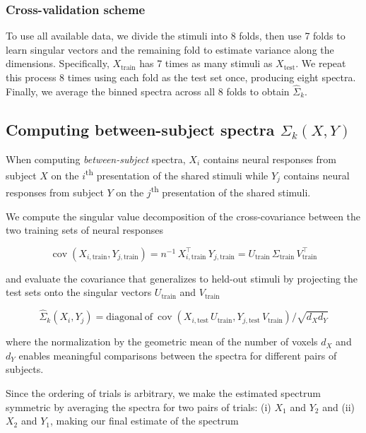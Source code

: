 \documentclass[10pt]{article}
\begin{document}
\subsubsection{Cross-validation scheme}\label{cross-validation-scheme}

To use all available data, we divide the stimuli into 8 folds, then use
7 folds to learn singular vectors and the remaining fold to estimate
variance along the dimensions. Specifically, \(X_\text{train}\) has 7
times as many stimuli as \(X_\text{test}\). We repeat this process 8
times using each fold as the test set once, producing eight spectra.
Finally, we average the binned spectra across all 8 folds to obtain
\(\hat{\Sigma}_k\).

\subsection{\texorpdfstring{Computing between-subject spectra
\(\Sigma_k(X,Y)\)}{Computing between-subject spectra \textbackslash Sigma\_k(X,Y)}}\label{computing-between-subject-spectra-sigma_kxy}

When computing \emph{between-subject} spectra, \(X_i\) contains neural
responses from subject \(X\) on the \(i\)\textsuperscript{th}
presentation of the shared stimuli while \(Y_j\) contains neural
responses from subject \(Y\) on the \(j\)\textsuperscript{th}
presentation of the shared stimuli.

We compute the singular value decomposition of the cross-covariance
between the two training sets of neural responses

\[
\operatorname{cov}
\left(X_{i,\text{train}} , Y_{j,\text{train}}\right)
= n^{-1}\,X_{i,\text{train}}^\top\,Y_{j,\text{train}}
= U_\text{train}\, \Sigma_\text{train}\, V_\text{train}^\top
\]

and evaluate the covariance that generalizes to held-out stimuli by
projecting the test sets onto the singular vectors \(U_\text{train}\)
and \(V_\text{train}\)

\[
\hat{\Sigma}_k(X_i,Y_j) = \mathrm{diagonal~of~} \operatorname{cov}
\left(X_{i, \text{test}}\, U_\text{train} , Y_{j, \text{test}}\, V_\text{train} \right) / \sqrt{d_X d_Y}
\]

where the normalization by the geometric mean of the number of voxels
\(d_X\) and \(d_Y\) enables meaningful comparisons between the spectra
for different pairs of subjects.

Since the ordering of trials is arbitrary, we make the estimated
spectrum symmetric by averaging the spectra for two pairs of trials: (i)
\(X_1\) and \(Y_2\) and (ii) \(X_2\) and \(Y_1\), making our final
estimate of the spectrum
\end{document}
